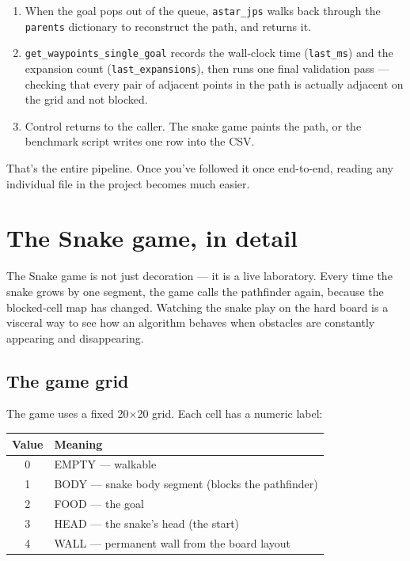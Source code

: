 \documentclass[11pt,a4paper]{article}
\begin{document}
\begin{enumerate}[leftmargin=20pt,itemsep=3pt]
  \item When the goal pops out of the queue, \texttt{astar\_jps} walks back through the \texttt{parents} dictionary to reconstruct the path, and returns it.

  \item \texttt{get\_waypoints\_single\_goal} records the wall-clock time (\texttt{last\_ms}) and the expansion count (\texttt{last\_expansions}), then runs one final validation pass --- checking that every pair of adjacent points in the path is actually adjacent on the grid and not blocked.

  \item Control returns to the caller. The snake game paints the path, or the benchmark script writes one row into the CSV.
\end{enumerate}

That's the entire pipeline. Once you've followed it once end-to-end, reading any individual file in the project becomes much easier.

\clearpage
\section{The Snake game, in detail}\label{sec:game}

The Snake game is not just decoration --- it is a live laboratory. Every time the snake grows by one segment, the game calls the pathfinder again, because the blocked-cell map has changed. Watching the snake play on the hard board is a visceral way to see how an algorithm behaves when obstacles are constantly appearing and disappearing.

\subsection{The game grid}

The game uses a fixed 20$\times$20 grid. Each cell has a numeric label:

\begin{center}
\begin{tabular}{@{}cl@{}}
\toprule
\textbf{Value} & \textbf{Meaning} \\
\midrule
0 & EMPTY --- walkable \\
1 & BODY --- snake body segment (blocks the pathfinder) \\
2 & FOOD --- the goal \\
3 & HEAD --- the snake's head (the start) \\
4 & WALL --- permanent wall from the board layout \\
\bottomrule
\end{tabular}
\end{center}
\end{document}

